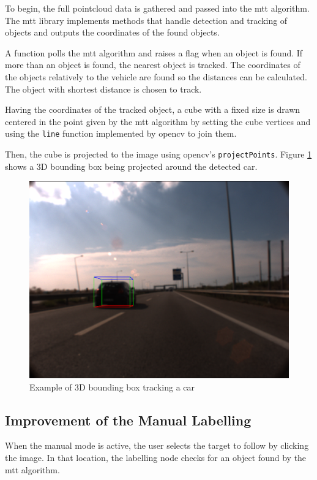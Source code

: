 To begin, the full pointcloud data is gathered and passed into the \gls{mtt} algorithm. The \gls{mtt} library implements methods that handle detection and tracking of objects and outputs the coordinates of the found objects. 

A function polls the \gls{mtt} algorithm and raises a flag when an object is found. If more than an object is found, the nearest object is tracked. The coordinates of the objects relatively to the vehicle are found so the distances can be calculated. The object with shortest distance is chosen to track.

Having the coordinates of the tracked object, a cube with a fixed size is drawn centered in the point given by the \gls{mtt} algorithm by setting the cube vertices and using the \texttt{line} function implemented by \gls{opencv} to join them.

Then, the cube is projected to the image using \gls{opencv}'s \texttt{projectPoints}. Figure \ref{fig:cube} shows a 3D bounding box being projected around the detected car.

\begin{figure}[htp]
	
	\centering
	\includegraphics[width=.6\textwidth]{caplabel/imgs/3dcube.png}
	
	\caption{Example of 3D bounding box tracking a car}
	\label{fig:cube}
	
\end{figure}

\subsection{Improvement of the Manual Labelling}

When the manual mode is active, the user selects the target to follow by clicking the image. In that location, the labelling node checks for an object found by the \gls{mtt} algorithm. 

